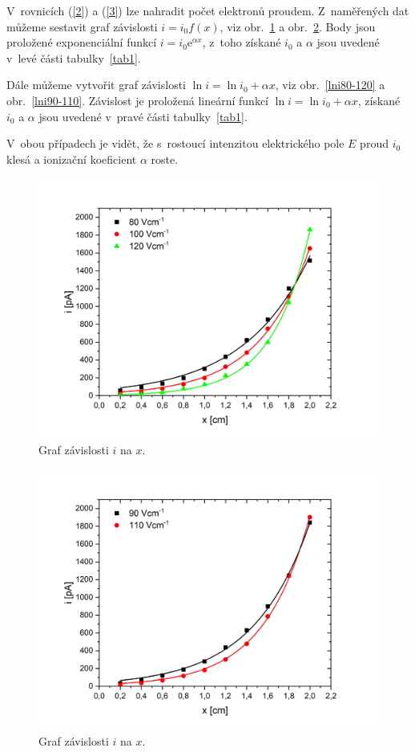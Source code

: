 \documentclass[a4paper,12pt]{article}
\newcommand{\e}{\text{e}}
\begin{document}
V~rovnicích (\ref{2}) a (\ref{3}) lze nahradit počet elektronů proudem. 
Z~naměřených dat můžeme sestavit graf závislosti $i = i_0 f(x)$, viz 
obr.~\ref{ifx80-120} a obr.~\ref{ifx90-110}. Body jsou proložené exponenciální funkcí $i = i_0 \e^{\alpha 
x}$, z~toho získané $i_0$ a $\alpha$ jsou uvedené v~levé části 
tabulky~\ref{tab1}.

Dále můžeme vytvořit graf závislosti $\ln i = \ln i_0 + \alpha x$, viz 
obr.~\ref{lni80-120} a obr.~\ref{lni90-110}. Závislost je proložená lineární funkcí $\ln i =\ln i_0 + \alpha x$, 
získané $i_0$ a $\alpha$ jsou uvedené v~pravé části tabulky~\ref{tab1}.

V~obou případech je vidět, že s~rostoucí intenzitou elektrického pole $E$ proud $i_0$ klesá a ionizační koeficient $\alpha$ roste.

\begin{figure}[h!]
	\centering
	\includegraphics[width=145mm]{ifx80-120.png}
	\caption{Graf závislosti $i$ na $x$.}
	\label{ifx80-120}
\end{figure}

\begin{figure}[h!]
	\centering
	\includegraphics[width=145mm]{ifx90-110.png}
	\caption{Graf závislosti $i$ na $x$.}
	\label{ifx90-110}
\end{figure}
\end{document}
